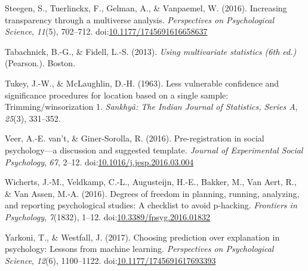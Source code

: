 \documentclass[man,floatsintext]{apa6}
\begin{document}
\leavevmode\hypertarget{ref-Steegen_et_al_2016}{}%
Steegen, S., Tuerlinckx, F., Gelman, A., \& Vanpaemel, W. (2016). Increasing transparency through a multiverse analysis. \emph{Perspectives on Psychological Science}, \emph{11}(5), 702--712. doi:\href{https://doi.org/10.1177/1745691616658637}{10.1177/1745691616658637}

\leavevmode\hypertarget{ref-Tabachnick_Fidell_2013}{}%
Tabachnick, B.-G., \& Fidell, L.-S. (2013). \emph{Using multivariate statistics (6th ed.)} (Pearson.). Boston.

\leavevmode\hypertarget{ref-Tukey_and_McLaughlin_1963}{}%
Tukey, J.-W., \& McLaughlin, D.-H. (1963). Less vulnerable confidence and significance procedures for location based on a single sample: Trimming/winsorization 1. \emph{Sankhyã: The Indian Journal of Statistics, Series A}, \emph{25}(3), 331--352.

\leavevmode\hypertarget{ref-vantveer_2016}{}%
Veer, A.-E. van't, \& Giner-Sorolla, R. (2016). Pre-registration in social psychology---a discussion and suggested template. \emph{Journal of Experimental Social Psychology}, \emph{67}, 2--12. doi:\href{https://doi.org/10.1016/j.jesp.2016.03.004}{10.1016/j.jesp.2016.03.004}

\leavevmode\hypertarget{ref-Wicherts_et_al_2016}{}%
Wicherts, J.-M., Veldkamp, C.-L., Augusteijn, H.-E., Bakker, M., Van Aert, R., \& Van Assen, M.-A. (2016). Degrees of freedom in planning, running, analyzing, and reporting psychological studies: A checklist to avoid p-hacking. \emph{Frontiers in Psychology}, \emph{7}(1832), 1--12. doi:\href{https://doi.org/10.3389/fpsyg.2016.01832}{10.3389/fpsyg.2016.01832}

\leavevmode\hypertarget{ref-Yarkoni_Westfall_2017}{}%
Yarkoni, T., \& Westfall, J. (2017). Choosing prediction over explanation in psychology: Lessons from machine learning. \emph{Perspectives on Psychological Science}, \emph{12}(6), 1100--1122. doi:\href{https://doi.org/10.1177/1745691617693393}{10.1177/1745691617693393}
\end{document}
